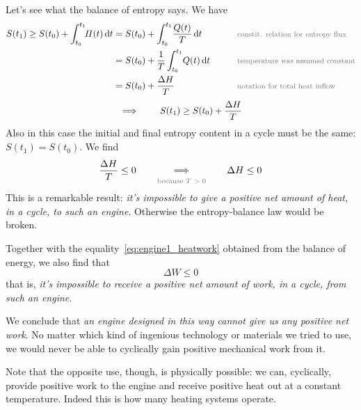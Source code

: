 \documentclass[a4paper,12pt,%
onecolumn,oneside,%
british%
]{memoir}
\newcommand*{\di}{\mathop{}\!\mathrm{d}}%
\newcommand*{\incr}{\Delta}%
\renewcommand*{\|}[1][]{\nonscript\:#1\vert\nonscript\:\mathopen{}}
\newcommand*{\yti}{t_{0}}
\newcommand*{\ytf}{t_{1}}
\newcommand*{\dt}{\di t}
\newcommand*{\yQ}{Q}%
\newcommand*{\yhe}{\incr H}%
\newcommand*{\yW}{\incr W}%
\newcommand*{\yS}{S}
\newcommand*{\yB}{\varPi}
\newcommand*{\yT}{T}%
\begin{document}
Let's see what the balance of entropy says. We have
\begin{equation*}
  \begin{gathered}
    \begin{aligned}
      \yS(\ytf) \ge \yS(\yti) + \int_{\yti}^{\ytf}\!\!\yB(t)\dt
      &= \yS(\yti) + \int_{\yti}^{\ytf}\!\frac{\yQ(t)}{\yT}\dt
      &\qquad&{\text{\footnotesize\color{midgrey}constit. relation for entropy flux}}
      \\
      &= \yS(\yti) + \frac{1}{\yT}\int_{\yti}^{\ytf}\!\yQ(t)\dt
      &\qquad&{\text{\footnotesize\color{midgrey}temperature was assumed constant}}
      \\
      &= \yS(\yti) + \frac{\yhe}{\yT}
      &\qquad&{\text{\footnotesize\color{midgrey}notation for total heat inflow}}
    \end{aligned}
    \\[\jot]
    \implies\qquad
    \yS(\ytf) \ge \yS(\yti) + \frac{\yhe}{\yT}
  \end{gathered}
\end{equation*}
Also in this case the initial and final entropy content in a cycle must be the same: $\yS(\ytf)=\yS(\yti)$. We find
\begin{equation}\label{eq:engine1_heatminus}
  \frac{\yhe}{\yT} \le 0
  \qquad\underbracket[0pt]{\Longrightarrow}_{\text{\color{midgrey}because $\yT>0$}}\qquad
  \yhe \le 0
\end{equation}
This is a remarkable result: \emph{it's impossible to give a positive net amount of heat, in a cycle, to such an engine}. Otherwise the entropy-balance law would be broken.

Together with the equality~\eqref{eq:engine1_heatwork} obtained from the balance of energy, we also find that
\begin{equation}
  \label{eq:engine1_noposwork}
  \yW \le 0
\end{equation}
that is, \emph{it's impossible to receive a positive net amount of work, in a cycle, from such an engine}.

We conclude that \emph{an engine designed in this way cannot give us any positive net work}. No matter which kind of ingenious technology or materials we tried to use, we would never be able to cyclically gain positive mechanical work from it.

Note that the opposite use, though, is physically possible: we can, cyclically, provide positive work to the engine and receive positive heat out at a constant temperature. Indeed this is how many heating systems operate.
\end{document}
